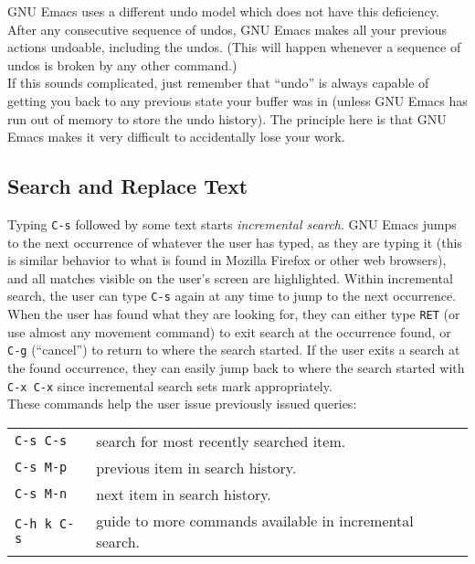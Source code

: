 \documentclass[12pt,a4paper,oneside]{article}
\begin{document}
GNU Emacs uses a different undo model which does not have this deficiency. After any consecutive sequence of undos, GNU Emacs makes all your previous actions undoable, including the undos. (This will happen whenever a sequence of undos is broken by any other command.)\\

If this sounds complicated, just remember that ``undo'' is always capable of getting you back to any previous state your buffer was in (unless GNU Emacs has run out of memory to store the undo history). The principle here is that GNU Emacs makes it very difficult to accidentally lose your work.

\subsection{Search and Replace Text}
Typing \texttt{C-s} followed by some text starts \emph{incremental search}. GNU Emacs jumps to the next occurrence of whatever the user has typed, as they are typing it (this is similar behavior to what is found in Mozilla Firefox or other web browsers), and all matches visible on the user's screen are highlighted. Within incremental search, the user can type \texttt{C-s} again at any time to jump to the next occurrence.\\

When the user has found what they are looking for, they can either type \texttt{RET} (or use almost any movement command) to exit search at the occurrence found, or \texttt{C-g} (``cancel'') to return to where the search started. If the user exits a search at the found occurrence, they can easily jump back to where the search started with \texttt{C-x C-x} since incremental search sets mark appropriately.\\

These commands help the user issue previously issued queries:\\

\begin{multicols}
  \begin{tabular}{@{}ll@{}}
    \texttt{C-s C-s} & search for most recently searched item.\\
    \texttt{C-s M-p} & previous item in search history.\\
    \texttt{C-s M-n} & next item in search history.\\
    \texttt{C-h k C-s} & guide to more commands available in incremental search.\\
  \end{tabular}
\end{multicols}\\\\
\end{document}
